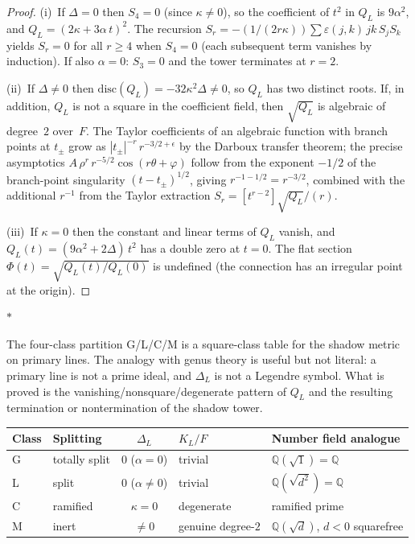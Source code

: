 \documentclass[11pt]{article}
\newcommand{\Q}{\mathbb{Q}}
\newcommand{\sep}{\bigskip\begin{center}$*$\end{center}\medskip}
\begin{document}
\begin{proof}
(i)~If $\Delta = 0$ then $S_4 = 0$ (since $\kappa \neq 0$),
so the coefficient of $t^2$ in $Q_L$ is $9\alpha^2$, and
$Q_L = (2\kappa + 3\alpha\,t)^2$.  The recursion
$S_r = -(1/(2r\kappa))\sum \varepsilon(j,k)\,jk\,S_j S_k$
yields $S_r = 0$ for all $r \geq 4$ when $S_4 = 0$
(each subsequent term vanishes by induction).
If also $\alpha = 0$: $S_3 = 0$ and the tower
terminates at $r = 2$.

(ii)~If $\Delta \neq 0$ then $\mathrm{disc}(Q_L)
= -32\kappa^2\Delta \neq 0$, so $Q_L$ has two distinct roots.
If, in addition, $Q_L$ is not a square in the coefficient field,
then $\sqrt{Q_L}$ is algebraic of degree~$2$ over~$F$.
The Taylor coefficients of an algebraic function with
branch points at $t_\pm$ grow as
$|t_\pm|^{-r}\,r^{-3/2+\epsilon}$ by the Darboux transfer
theorem; the precise asymptotics
$A\,\rho^r\,r^{-5/2}\cos(r\theta + \varphi)$
follow from the exponent $-1/2$ of the branch-point singularity
$(t - t_\pm)^{1/2}$, giving $r^{-1-1/2} = r^{-3/2}$, combined
with the additional $r^{-1}$ from the Taylor extraction
$S_r = [t^{r-2}]\sqrt{Q_L}/(r)$.

(iii)~If $\kappa = 0$ then the constant and linear terms of
$Q_L$ vanish, and $Q_L(t) = (9\alpha^2 + 2\Delta)\,t^2$ has
a double zero at $t = 0$.  The flat section
$\Phi(t) = \sqrt{Q_L(t)/Q_L(0)}$ is undefined (the
connection has an irregular point at the origin).
\end{proof}

\sep

The four-class partition G/L/C/M is a square-class table for the
shadow metric on primary lines.  The analogy with genus theory is
useful but not literal: a primary line is not a prime ideal, and
$\Delta_L$ is not a Legendre symbol.  What is proved is the
vanishing/nonsquare/degenerate pattern of $Q_L$ and the resulting
termination or nontermination of the shadow tower.

\begin{center}
\small
\renewcommand{\arraystretch}{1.15}
\begin{tabular}{@{}llcll@{}}
\textbf{Class}
  & \textbf{Splitting}
  & $\Delta_L$
  & \textbf{$K_L/F$}
  & \textbf{Number field analogue}\\
\hline
G & totally split & $0$ ($\alpha = 0$)
  & trivial & $\Q(\sqrt{1}) = \Q$ \\
L & split & $0$ ($\alpha \neq 0$)
  & trivial & $\Q(\sqrt{d^2}) = \Q$ \\
C & ramified & $\kappa = 0$
  & degenerate & ramified prime \\
M & inert & $\neq 0$
  & genuine degree-$2$ & $\Q(\sqrt{d})$, $d < 0$ squarefree
\end{tabular}
\end{center}
\end{document}
